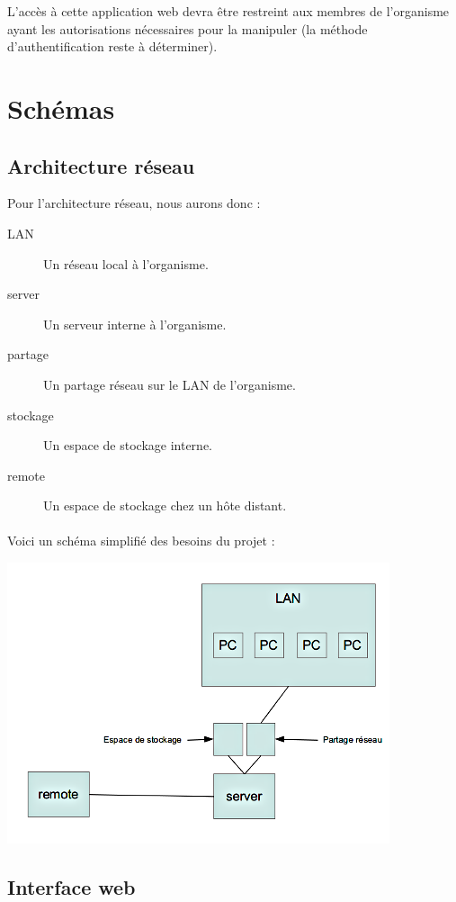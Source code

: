 L'accès à cette application web devra être restreint aux membres de l'organisme ayant les autorisations
nécessaires pour la manipuler (la méthode d'authentification reste à déterminer).

\section{Schémas}

\subsection{Architecture réseau}

Pour l'architecture réseau, nous aurons donc :

\begin{description}
     \item[LAN] Un réseau local à l'organisme.
     \item[server] Un serveur interne à l'organisme.
     \item[partage] Un partage réseau sur le LAN de l'organisme.
     \item[stockage] Un espace de stockage interne.
     \item[remote] Un espace de stockage chez un hôte distant.
\end{description}

\paragraph{}
Voici un schéma simplifié des besoins du projet :

\includegraphics{schema01.png}

\subsection{Interface web}

